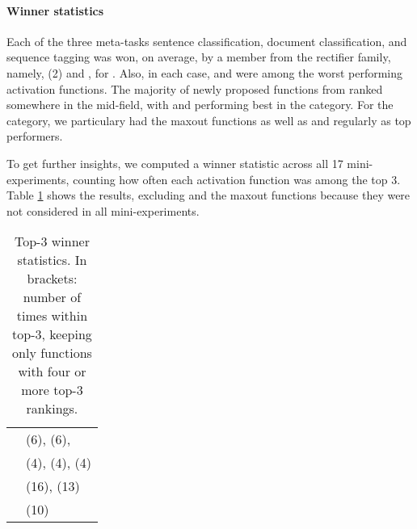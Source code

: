\paragraph{Winner statistics} 
Each of the three meta-tasks sentence classification, document classification, and sequence tagging was won, on average, by a member from the rectifier family, namely, \relu{} (2) and \elu{}, for \best{}. Also, in each case, \cube{} and \cosid{} were among the worst performing activation functions. The majority of newly proposed functions from \citet{Ramach:2018} ranked somewhere in the mid-field, with \swish{} and \minsin{} performing best in the \best{} category.
For the \avg{} category, we particulary had the maxout functions as well as \pentan{} and \mysin{} regularly as top performers. 

To get further insights, we computed a winner statistic across all 17 mini-experiments, counting how often each activation function was among the top 3. Table \ref{table:topN} shows the results, excluding \prelu{} and the maxout functions because they were not considered in all mini-experiments. 

\begin{table}[!htb]
  \centering
  \begin{tabular}{ll}
  \toprule
    \best{} & \pentan{} (6), \swish{} (6), \\
    & \elu{} (4), \relu{} (4), \lrelua{} (4)\\   
    \avg{} & \pentan{} (16), \mytanh{} (13)\\
    & \mysin{} (10) \\
  \bottomrule
  \end{tabular}
  \caption{Top-3 winner statistics. In brackets: number of times within top-3, keeping only functions with four or more top-3 rankings.}
  \label{table:topN}
\end{table}

